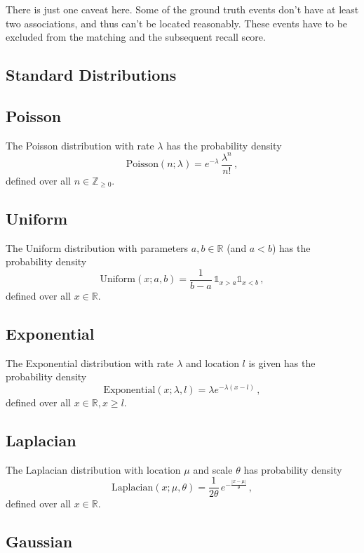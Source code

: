 \documentclass[12pt,letterpaper,onecolumn,oneside]{article}
\begin{document}
There is just one caveat here. Some of the ground truth events don't
have at least two associations, and thus can't be located
reasonably. These events have to be excluded from the matching and the
subsequent recall score.

\begin{appendices}

\section{Standard Distributions}

\subsection{Poisson}

The Poisson distribution with rate $\lambda$ has the probability density
\[ \text{Poisson}(n; \lambda) =  e ^ {-\lambda}  \, \frac{  \lambda ^ n  }{n !} \,
, \]
defined over all $n \in \mathbb{Z}_{\ge 0}$.

\subsection{Uniform}

The Uniform distribution with parameters $a, b \in \mathbb{R}$ (and $a <
b$) has the probability density
\[ \text{Uniform}(x; a, b) = \frac{1}{b - a} \, \mathbb{1}_{x>a}
\mathbb{1}_{x<b}\, ,\]
defined over all $x \in \mathbb{R}$.

\subsection{Exponential}

The Exponential distribution with rate $\lambda$ and location $l$ is
given has the probability density
\[ \text{Exponential}(x; \lambda, l) = \lambda e^{-\lambda (x - l)} \,
,\]
defined over all $x \in \mathbb{R}, x \ge l$.

\subsection{Laplacian}

The Laplacian distribution with location $\mu$ and scale $\theta$ has
probability density
\[ \text{Laplacian}(x; \mu, \theta) = \frac{1}{2 \theta} \, 
e^{-\frac{|x - \mu|}{\theta}}
\, ,\]
defined over all $x \in \mathbb{R}$.

\subsection{Gaussian}


\end{appendices}
\end{document}
